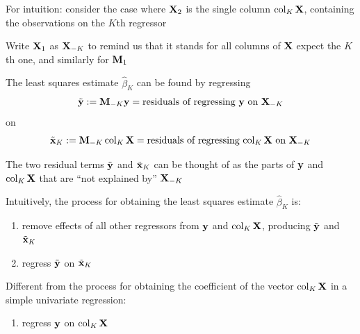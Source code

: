 \begin{frame}

    \vspace{2em}
    For intuition: consider the case where $\mathbf X_2$ is the single column 
    $\operatorname{col}_K \mathbf X$, containing the
    observations on the $K$th regressor
    
    Write $\mathbf X_1$ as $\mathbf X_{-K}$ to remind us
    that it stands for all columns of $\mathbf X$ expect the $K$th one, and
    similarly for $\mathbf M_1$
    
    \vspace{.7em}
    The least squares estimate $\hat \beta_K$ can be found by regressing 
    \begin{equation*}
        \label{eq:resregy}
        \tilde {{\mathbf y}} 
        := \mathbf M_{-K} {\mathbf y} = \text{residuals of regressing ${\mathbf y}$ on
        $\mathbf X_{-K}$}   
    \end{equation*}
    on
    \begin{equation*}
        \label{eq:resregx}
        \tilde {{\mathbf x}}_K 
        := \mathbf M_{-K} \operatorname{col}_K \mathbf X 
            = \text{residuals of regressing
                $\operatorname{col}_K \mathbf X$ on $\mathbf X_{-K}$}   
    \end{equation*}
    

\end{frame}

\begin{frame}

    \vspace{2em}
    The two residual terms $\tilde {{\mathbf y}}$ and $\tilde
    {{\mathbf x}}_K$ can be thought of as the parts of ${\mathbf y}$ and
    $\operatorname{col}_K \mathbf X$ that are ``not explained by'' $\mathbf X_{-K}$
    
    Intuitively, the process for obtaining the least squares estimate $\hat
    \beta_K$ is:
    \begin{enumerate}
        \item remove effects of all other regressors from ${\mathbf y}$ and
            $\operatorname{col}_K \mathbf X$, producing $\tilde {{\mathbf y}}$ and $\tilde
            {{\mathbf x}}_K$
        \item regress $\tilde {{\mathbf y}}$ on $\tilde {{\mathbf x}}_K$
    \end{enumerate}
    
    \vspace{.7em}
    Different from the process for obtaining the coefficient of 
    the vector $\operatorname{col}_K \mathbf X$ in a simple univariate regression:
    \begin{enumerate}
        \item regress ${\mathbf y}$ on $\operatorname{col}_K \mathbf X$
    \end{enumerate}
    
\end{frame}

